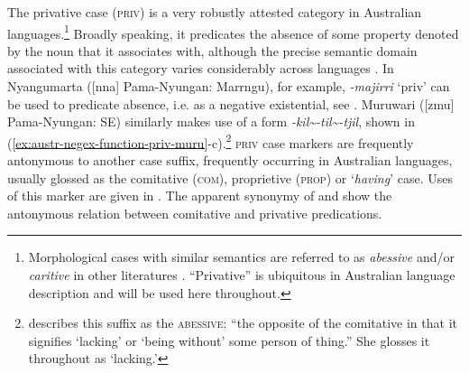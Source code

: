 \documentclass[output=paper,draft,draftmode,colorlinks,citecolor=brown]{langscibook}
\begin{document}
The privative case (\textsc{priv}) is a very robustly attested category in
Australian languages.\footnote{Morphological cases with similar
semantics are referred to as \textit{abessive} and\slash or \textit{caritive}
in other literatures \citep[e.g. for Uralic
in][]{Hamari2011-austr,Hamari2015,Tamm2015}. ``Privative'' is ubiquitous in
Australian language description and will be used here throughout.}
Broadly speaking, it predicates the absence of some property denoted by
the noun that it associates with, although the precise semantic domain
associated with this category varies considerably across languages
\citep[cf. arguments for the predicative status of negative
existential markers in ][139]{Veselinova2013}. In Nyangumarta
([nna] Pama-Nyungan: Marrngu), for example, \textit{-majirri}
`priv' can be used to predicate absence, i.e. as a
    negative existential, see . Muruwari ([zmu]
Pama-Nyungan: SE) similarly makes use of a form
\textit{-kil\textasciitilde-til\textasciitilde-tjil}, shown in
    (\ref{ex:austr-negex-function-priv-muru}-c).\footnote{\citet[77]{Oates1988} describes this suffix as
the \textsc{abessive}: ``the opposite of the comitative in that it
signifies `lacking' or `being without' some person of thing.'' She glosses it throughout as `lacking.'}
\textsc{priv} case markers are frequently antonymous to another case
suffix, frequently occurring in Australian languages, usually glossed
as the
comitative (\textsc{com}), proprietive (\textsc{prop}) or `\textit{having}'
case. Uses of this marker are given in
. The apparent synonymy of
 and
 show the antonymous relation between comitative and privative predications.
%
\end{document}

